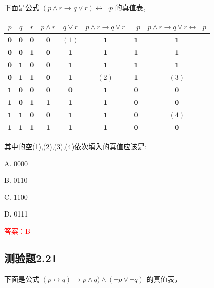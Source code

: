 \documentclass[UTF8, heading=true]{ctexart}
\begin{document}
下面是公式 $(p \wedge r \rightarrow q \vee r) \leftrightarrow \neg p$ 的真值表,
\begin{table}[H]
  \centering
\begin{tabular}{c|c|c|c|c|c|c|c}
\hline$p$ & $q$ & $r$ & $p \wedge r$ & $q \vee r$ & $p \wedge r \rightarrow q \vee r$ & $\neg p$ & $p \wedge r \rightarrow q \vee r \leftrightarrow \neg p$ \\
\hline $\mathbf{0}$ & $\mathbf{0}$ & $\mathbf{0}$ & $\mathbf{0}$ & $(1)$ & $\mathbf{1}$ & $\mathbf{1}$ & $\mathbf{1}$ \\
\hline $\mathbf{0}$ & $\mathbf{0}$ & $\mathbf{1}$ & $\mathbf{0}$ & $\mathbf{1}$ & $\mathbf{1}$ & $\mathbf{1}$ & $\mathbf{1}$ \\
\hline $\mathbf{0}$ & $\mathbf{1}$ & $\mathbf{0}$ & $\mathbf{0}$ & $\mathbf{1}$ & $\mathbf{1}$ & $\mathbf{1}$ & $\mathbf{1}$ \\
\hline $\mathbf{0}$ & $\mathbf{1}$ & $\mathbf{1}$ & $\mathbf{0}$ & $\mathbf{1}$ & $(2)$ & $\mathbf{1}$ & $(3)$ \\
\hline $\mathbf{1}$ & $\mathbf{0}$ & $\mathbf{0}$ & $\mathbf{0}$ & $\mathbf{0}$ & $\mathbf{1}$ & $\mathbf{0}$ & $\mathbf{0}$ \\
\hline $\mathbf{1}$ & $\mathbf{0}$ & $\mathbf{1}$ & $\mathbf{1}$ & $\mathbf{1}$ & $\mathbf{1}$ & $\mathbf{0}$ & $\mathbf{0}$ \\
\hline $\mathbf{1}$ & $\mathbf{1}$ & $\mathbf{0}$ & $\mathbf{0}$ & $\mathbf{1}$ & $\mathbf{1}$ & $\mathbf{0}$ & $(4)$ \\
\hline $\mathbf{1}$ & $\mathbf{1}$ & $\mathbf{1}$ & $\mathbf{1}$ & $\mathbf{1}$ & $\mathbf{1}$ & $\mathbf{0}$ & $\mathbf{0}$ \\
\hline
\end{tabular}
\end{table}

其中的空(1),(2),(3),(4)依次填入的真值应该是:

A. 0000

B. 0110

C. 1100

D. 0111

\textcolor{red}{答案：B}

\subsection{测验题2.21}

下面是公式 $(p \leftrightarrow q) \rightarrow p \wedge q) \wedge(\neg p \vee \neg q)$ 的真值表，
\end{document}
